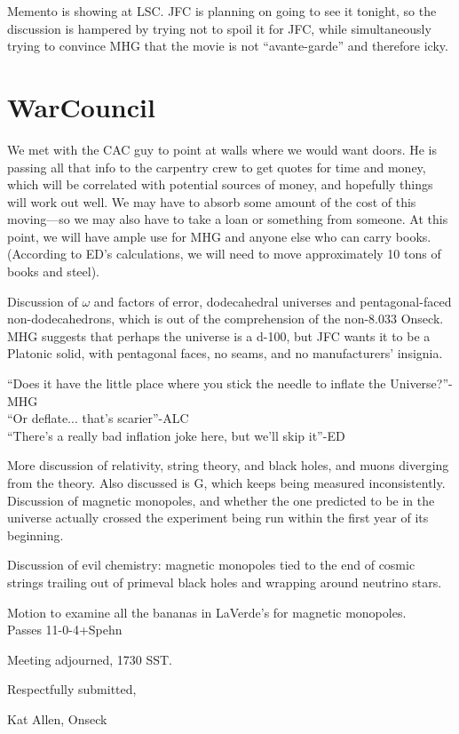 \documentclass[10pt]{article}
\begin{document}
Memento is showing at LSC. JFC is planning on going to see it tonight,
so the discussion is hampered by trying not to spoil it for JFC, while
simultaneously trying to convince MHG that the movie is not
``avante-garde'' and therefore icky.

\section*{WarCouncil}
We met with the CAC guy to point at walls where we would want
doors. He is passing all that info to the carpentry crew to get quotes
for time and money, which will be correlated with potential sources of
money, and hopefully things will work out well.  We may have to absorb
some amount of the cost of this moving---so we may also have to take a
loan or something from someone. At this point, we will have ample use
for MHG and anyone else who can carry books. (According to ED's
calculations, we will need to move approximately 10 tons of books and
steel).

Discussion of $\omega$ and factors of error, dodecahedral universes
and pentagonal-faced non-dodecahedrons, which is out of the
comprehension of the non-8.033 Onseck.  MHG suggests that perhaps the
universe is a d-100, but JFC wants it to be a Platonic solid, with
pentagonal faces, no seams, and no manufacturers' insignia.

``Does it have the little place where you stick the needle to inflate
the Universe?''-MHG\\
``Or deflate... that's scarier''-ALC\\
``There's a really bad inflation joke here, but we'll skip it''-ED

More discussion of relativity, string theory, and black holes, and
muons diverging from the theory. Also discussed is G, which keeps
being measured inconsistently. Discussion of magnetic monopoles, and
whether the one predicted to be in the universe actually crossed the
experiment being run within the first year of its beginning.

Discussion of evil chemistry:  magnetic monopoles tied to the end of
cosmic strings trailing out of primeval black holes and wrapping
around neutrino stars.

Motion to examine all the bananas in LaVerde's for magnetic monopoles.\\
Passes 11-0-4+Spehn

\vspace{12pt}

\noindent
Meeting adjourned, 1730 SST.

\vspace{18pt}

\centerline{Respectfully submitted,}
\centerline{Kat Allen,  Onseck}
\end{document}

